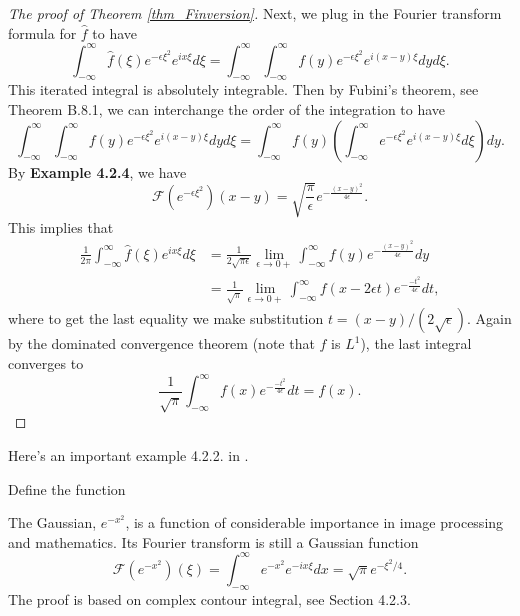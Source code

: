 \begin{proof}[The proof of Theorem \ref{thm_Finversion}]
Next, we plug in the Fourier transform formula for $\hat{f}$ to have
\[
\int_{-\infty}^{\infty} \hat{f}(\xi) e^{-\epsilon \xi^2} e^{i x \xi } d \xi 
= \int_{-\infty}^{\infty} \int_{-\infty}^{\infty}   {f}(y) e^{-\epsilon \xi^2} e^{i (x-y)\xi } d y d \xi.
\]
This iterated integral is absolutely integrable.
Then by Fubini's theorem, see Theorem B.8.1, 
we can interchange the order of the integration to have
\[
\int_{-\infty}^{\infty} \int_{-\infty}^{\infty}   {f}(y) e^{-\epsilon \xi^2} e^{i (x-y)\xi } d y d \xi = 
\int_{-\infty}^{\infty}  {f}(y) (\int_{-\infty}^{\infty} e^{-\epsilon \xi^2} e^{i (x-y)\xi } d \xi) d y.
\]
By \textbf{Example 4.2.4}, we have
\[
\mathscr{F}( e^{-\epsilon \xi^2})(x-y) = \sqrt{\frac{\pi}{\epsilon}} e^{- \frac{(x-y)^2}{4\epsilon}}.
\]
This implies that
\begin{align*}
\frac{1}{2\pi} \int_{-\infty}^{\infty} \hat{f}(\xi) e^{i x \xi } d \xi 
&=  \frac{1}{2\sqrt{\pi \epsilon}} \lim_{\epsilon \rightarrow 0+} \int_{-\infty}^{\infty} {f}(y)  e^{- \frac{(x-y)^2}{4\epsilon}} d y\\
&= \frac{1}{\sqrt{\pi}} \lim_{\epsilon \rightarrow 0+} \int_{-\infty}^{\infty} {f}(x-2 \epsilon t)  e^{- \frac{-t^2}{4\epsilon}} d t,
\end{align*}
where to get the last equality we make substitution $t = {(x-y)}/(2 \sqrt{\epsilon})$.
Again by the dominated convergence theorem (note that $f$ is $L^1$), the last integral converges to 
\[
\frac{1}{\sqrt{\pi}} \int_{-\infty}^{\infty} {f}(x)  e^{- \frac{-t^2}{4\epsilon}} d t = f(x). 
\]
\end{proof}


Here's an important example 4.2.2. in \cite{epstein2007introduction}.

\begin{example}
    Define the function 
\end{example}


\begin{example}[Example 4.2.4]
The Gaussian, $e^{-x^2}$, is a function of considerable importance in image processing and mathematics.
Its Fourier transform is still a Gaussian function 
\[
\mathcal{F}(e^{-x^2})(\xi) = \int_{-\infty}^\infty e^{-x^2} e^{-ix \xi} d x = \sqrt{\pi} e^{-\xi^2/4}.
\]
The proof is based on complex contour integral, see Section 4.2.3.
\end{example}

